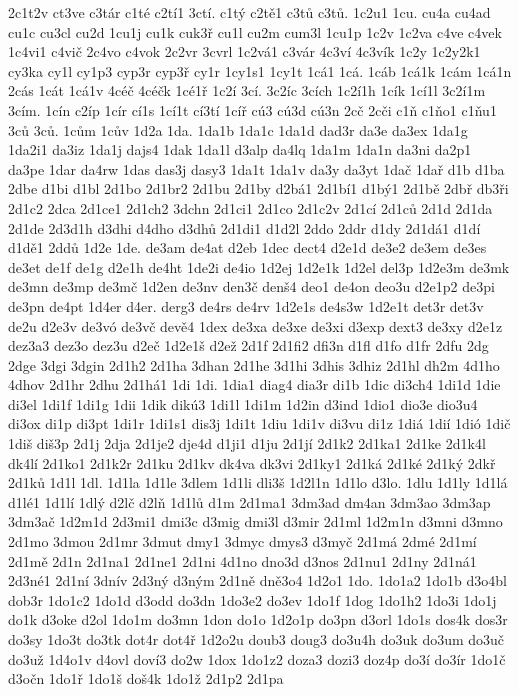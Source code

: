 {2c1t2v
ct3ve
c3tár
c1té
c2tí1
3ctí.
c1tý
c2tě1
c3tů
c3tů.
1c2u1
1cu.
cu4a
cu4ad
cu1c
cu3cl
cu2d
1cu1j
cu1k
cuk3ř
cu1l
cu2m
cum3l
1cu1p
1c2v
1c2va
c4ve
c4vek
1c4vi1
c4vič
2c4vo
c4vok
2c2vr
3cvrl
1c2vá1
c3vár
4c3ví
4c3vík
1c2y
1c2y2k1
cy3ka
cy1l
cy1p3
cyp3r
cyp3ř
cy1r
1cy1s1
1cy1t
1cá1
1cá.
1cáb
1cá1k
1cám
1cá1n
2cás
1cát
1cá1v
4céč
4céčk
1cé1ř
1c2í
3cí.
3c2íc
3cích
1c2í1h
1cík
1cí1l
3c2í1m
3cím.
1cín
c2íp
1cír
cí1s
1cí1t
cí3tí
1cíř
cú3
cú3d
cú3n
2cč
2cči
c1ň
c1ňo1
c1ňu1
3ců
3ců.
1cům
1cův
1d2a
1da.
1da1b
1da1c
1da1d
dad3r
da3e
da3ex
1da1g
1da2i1
da3iz
1da1j
dajs4
1dak
1da1l
d3alp
da4lq
1da1m
1da1n
da3ni
da2p1
da3pe
1dar
da4rw
1das
das3j
dasy3
1da1t
1da1v
da3y
da3yt
1dač
1dař
d1b
d1ba
2dbe
d1bi
d1bl
2d1bo
2d1br2
2d1bu
2d1by
d2bá1
2d1bí1
d1bý1
2d1bě
2dbř
db3ři
2d1c2
2dca
2d1ce1
2d1ch2
3dchn
2d1ci1
2d1co
2d1c2v
2d1cí
2d1ců
2d1d
2d1da
2d1de
2d3d1h
d3dhi
d4dho
d3dhů
2d1di1
d1d2l
2ddo
2ddr
d1dy
2d1dá1
d1dí
d1dě1
2ddů
1d2e
1de.
de3am
de4at
d2eb
1dec
dect4
d2e1d
de3e2
de3em
de3es
de3et
de1f
de1g
d2e1h
de4ht
1de2i
de4io
1d2ej
1d2e1k
1d2el
del3p
1d2e3m
de3mk
de3mn
de3mp
de3mč
1d2en
de3nv
den3č
denš4
deo1
de4on
deo3u
d2e1p2
de3pi
de3pn
de4pt
1d4er
d4er.
derg3
de4rs
de4rv
1d2e1s
de4s3w
1d2e1t
det3r
det3v
de2u
d2e3v
de3vó
de3vč
devě4
1dex
de3xa
de3xe
de3xi
d3exp
dext3
de3xy
d2e1z
dez3a3
dez3o
dez3u
d2eč
1d2e1š
d2ež
2d1f
2d1fi2
dfi3n
d1fl
d1fo
d1fr
2dfu
2dg
2dge
3dgi
3dgin
2d1h2
2d1ha
3dhan
2d1he
3d1hi
3dhis
3dhiz
2d1hl
dh2m
4d1ho
4dhov
2d1hr
2dhu
2d1há1
1di
1di.
1dia1
diag4
dia3r
di1b
1dic
di3ch4
1di1d
1die
di3el
1di1f
1di1g
1dii
1dik
dikú3
1di1l
1di1m
1d2in
d3ind
1dio1
dio3e
dio3u4
di3ox
di1p
di3pt
1di1r
1di1s1
dis3j
1di1t
1diu
1di1v
di3vu
di1z
1diá
1dií
1dió
1dič
1diš
diš3p
2d1j
2dja
2d1je2
dje4d
d1ji1
d1ju
2d1jí
2d1k2
2d1ka1
2d1ke
2d1k4l
dk4lí
2d1ko1
2d1k2r
2d1ku
2d1kv
dk4va
dk3vi
2d1ky1
2d1ká
2d1ké
2d1ký
2dkř
2d1ků
1d1l
1dl.
1d1la
1d1le
3dlem
1d1li
dli3š
1d2l1n
1d1lo
d3lo.
1dlu
1d1ly
1d1lá
d1lé1
1d1lí
1dlý
d2lč
d2lň
1d1lů
d1m
2d1ma1
3dm3ad
dm4an
3dm3ao
3dm3ap
3dm3ač
1d2m1d
2d3mi1
dmi3c
d3mig
dmi3l
d3mir
2d1ml
1d2m1n
d3mni
d3mno
2d1mo
3dmou
2d1mr
3dmut
dmy1
3dmyc
dmys3
d3myč
2d1má
2dmé
2d1mí
2d1mě
2d1n
2d1na1
2d1ne1
2d1ni
4d1no
dno3d
d3nos
2d1nu1
2d1ny
2d1ná1
2d3né1
2d1ní
3dnív
2d3ný
d3ným
2d1ně
dně3o4
1d2o1
1do.
1do1a2
1do1b
d3o4bl
dob3r
1do1c2
1do1d
d3odd
do3dn
1do3e2
do3ev
1do1f
1dog
1do1h2
1do3i
1do1j
do1k
d3oke
d2ol
1do1m
do3mn
1don
do1o
1d2o1p
do3pn
d3orl
1do1s
dos4k
dos3r
do3sy
1do3t
do3tk
dot4r
dot4ř
1d2o2u
doub3
doug3
do3u4h
do3uk
do3um
do3uč
do3už
1d4o1v
d4ovl
doví3
do2w
1dox
1do1z2
doza3
dozi3
doz4p
do3í
do3ír
1do1č
d3očn
1do1ř
1do1š
doš4k
1do1ž
2d1p2
2d1pa
}
